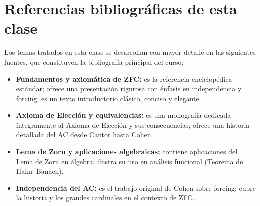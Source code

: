 \section*{Referencias bibliográficas de esta clase}

Los temas tratados en esta clase se desarrollan con mayor detalle en las siguientes fuentes, que constituyen la bibliografía principal del curso:

\begin{itemize}[leftmargin=2em]
  \item \textbf{Fundamentos y axiomática de ZFC:} \cite{jech2003} es la referencia enciclopédica estándar; \cite{kunen2011} ofrece una presentación rigurosa con énfasis en independencia y forcing; \cite{halmos1960} es un texto introductorio clásico, conciso y elegante.

  \item \textbf{Axioma de Elección y equivalencias:} \cite{herrlich2006} es una monografía dedicada íntegramente al Axioma de Elección y sus consecuencias; \cite{moore1982} ofrece una historia detallada del AC desde Cantor hasta Cohen.

  \item \textbf{Lema de Zorn y aplicaciones algebraicas:} \cite{lang2002} contiene aplicaciones del Lema de Zorn en álgebra; \cite{rudin1991} ilustra su uso en análisis funcional (Teorema de Hahn–Banach).

  \item \textbf{Independencia del AC:} \cite{cohen1966} es el trabajo original de Cohen sobre forcing; \cite{kanamori2003} cubre la historia y los grandes cardinales en el contexto de ZFC.
\end{itemize}

